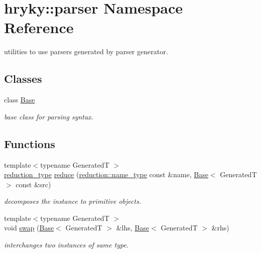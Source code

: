 \hypertarget{namespacehryky_1_1parser}{\section{hryky\-:\-:parser Namespace Reference}
\label{namespacehryky_1_1parser}
}


utilities to use parsers generated by parser generator.  


\subsection*{Classes}
\begin{DoxyCompactItemize}
\item 
class \hyperlink{classhryky_1_1parser_1_1_base}{Base}
\begin{DoxyCompactList}\small\item\em base class for parsing syntax. \end{DoxyCompactList}\end{DoxyCompactItemize}
\subsection*{Functions}
\begin{DoxyCompactItemize}
\item 
\hypertarget{namespacehryky_1_1parser_a41d3abfe59948313b274c24612cfcbf2}{{\footnotesize template$<$typename Generated\-T $>$ }\\\hyperlink{namespacehryky_a343a9a4c36a586be5c2693156200eadc}{reduction\-\_\-type} \hyperlink{namespacehryky_1_1parser_a41d3abfe59948313b274c24612cfcbf2}{reduce} (\hyperlink{namespacehryky_1_1reduction_ac686c30a4c8d196bbd0f05629a6b921f}{reduction\-::name\-\_\-type} const \&name, \hyperlink{classhryky_1_1parser_1_1_base}{Base}$<$ Generated\-T $>$ const \&src)}\label{namespacehryky_1_1parser_a41d3abfe59948313b274c24612cfcbf2}

\begin{DoxyCompactList}\small\item\em decomposes the instance to primitive objects. \end{DoxyCompactList}\item 
{\footnotesize template$<$typename Generated\-T $>$ }\\void \hyperlink{namespacehryky_1_1parser_acbeac181da6c2a9f92e921f9133cfa8f}{swap} (\hyperlink{classhryky_1_1parser_1_1_base}{Base}$<$ Generated\-T $>$ \&lhs, \hyperlink{classhryky_1_1parser_1_1_base}{Base}$<$ Generated\-T $>$ \&rhs)
\begin{DoxyCompactList}\small\item\em interchanges two instances of same type. \end{DoxyCompactList}\end{DoxyCompactItemize}


